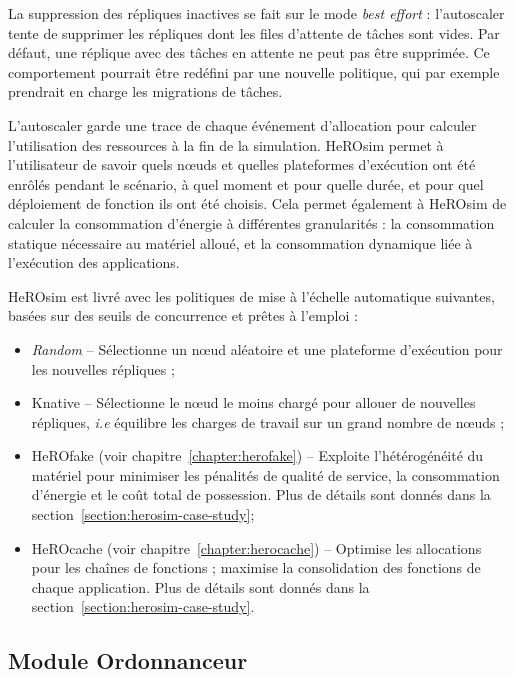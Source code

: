 La suppression des répliques inactives se fait sur le mode \textit{best effort} : l'autoscaler tente de supprimer les répliques dont les files d'attente de tâches sont vides. Par défaut, une réplique avec des tâches en attente ne peut pas être supprimée. Ce comportement pourrait être redéfini par une nouvelle politique, qui par exemple prendrait en charge les migrations de tâches.

L'autoscaler garde une trace de chaque événement d'allocation pour calculer l'utilisation des ressources à la fin de la simulation. HeROsim permet à l'utilisateur de savoir quels nœuds et quelles plateformes d'exécution ont été enrôlés pendant le scénario, à quel moment et pour quelle durée, et pour quel déploiement de fonction ils ont été choisis. Cela permet également à HeROsim de calculer la consommation d'énergie à différentes granularités : la consommation statique nécessaire au matériel alloué, et la consommation dynamique liée à l'exécution des applications.


HeROsim est livré avec les politiques de mise à l'échelle automatique suivantes, basées sur des seuils de concurrence et prêtes à l'emploi :

\begin{itemize}
    \item \textit{Random} -- Sélectionne un nœud aléatoire et une plateforme d'exécution pour les nouvelles répliques ;
    \item Knative -- Sélectionne le nœud le moins chargé pour allouer de nouvelles répliques, \textit{i.e} équilibre les charges de travail sur un grand nombre de nœuds ;
    \item HeROfake (voir chapitre~\ref{chapter:herofake}) -- Exploite l'hétérogénéité du matériel pour minimiser les pénalités de qualité de service, la consommation d'énergie et le coût total de possession. Plus de détails sont donnés dans la section~\ref{section:herosim-case-study};
    \item HeROcache (voir chapitre~\ref{chapter:herocache}) -- Optimise les allocations pour les chaînes de fonctions ; maximise la consolidation des fonctions de chaque application. Plus de détails sont donnés dans la section~\ref{section:herosim-case-study}.
\end{itemize}

\subsection{Module Ordonnanceur}

